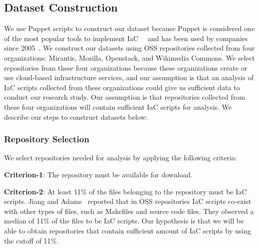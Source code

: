 \documentclass[smallextended]{svjour3}       %
\begin{document}




\subsection{Dataset Construction} 
\label{meth-ds}

We use Puppet scripts to construct our dataset because Puppet is considered one of the most popular tools to implement IaC~\citep{JiangAdamsMSR2015}~\citep{ShambaughRehearsal2016} and has been used by companies since 2005~\citep{propuppet:book}. We construct our datasets using OSS repositories collected from four organizations: Mirantis, Mozilla, Openstack, and Wikimedia Commons. We select repositories from these four organizations because these organizations create or use cloud-based infrastructure services, and our assumption is that an analysis of IaC scripts collected from these organizations could give us sufficient data to conduct our research study. Our assumption is that repositories collected from these four organizations will contain sufficient IaC scripts for analysis. We describe our steps to construct datasets below: 

\subsubsection{Repository Selection}
\label{repo-collect}

We select repositories needed for analysis by applying the following criteria:

\textbf{Criterion-1}: The repository must be available for download.

\textbf{Criterion-2}: At least 11\% of the files belonging to the repository must be IaC scripts. Jiang and Adams~\citep{JiangAdamsMSR2015} reported that in OSS repositories IaC scripts co-exist with other types of files, such as Makefiles and source code files. They observed a median of 11\% of the files to be IaC scripts. Our hypothesis is that we will be able to obtain repositories that contain sufficient amount of IaC scripts by using the cutoff of 11\%. 
\end{document}
